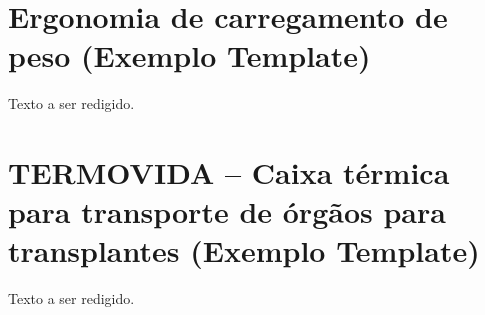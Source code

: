 \section{Ergonomia de carregamento de peso (Exemplo Template)}

Texto a ser redigido.

\section{TERMOVIDA – Caixa térmica para transporte de órgãos para transplantes (Exemplo Template)}

Texto a ser redigido.